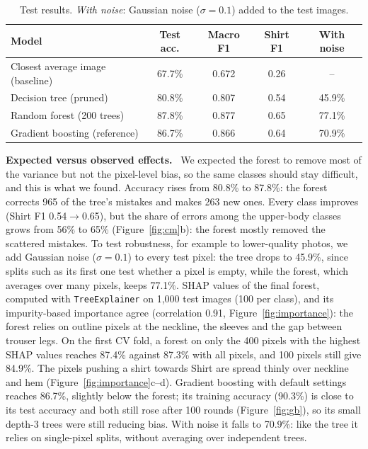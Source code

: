 \documentclass[11pt,a4paper]{article}
\newcommand{\pkg}[1]{\texttt{#1}}
\newcommand{\para}[1]{\textbf{#1}\ }
\begin{document}
\begin{table}[h]
\centering
\small
\begin{tabular}{lcccc}
\toprule
Model & Test acc. & Macro F1 & Shirt F1 & With noise \\
\midrule
Closest average image (baseline) & 67.7\% & 0.672 & 0.26 & -- \\
Decision tree (pruned)           & 80.8\% & 0.807 & 0.54 & 45.9\% \\
Random forest (200 trees)        & 87.8\% & 0.877 & 0.65 & 77.1\% \\
Gradient boosting (reference)    & 86.7\% & 0.866 & 0.64 & 70.9\% \\
\bottomrule
\end{tabular}
\caption{Test results. \emph{With noise}: Gaussian noise ($\sigma=0.1$) added to the test images.}
\label{tab:results}
\end{table}

\para{Expected versus observed effects.} We expected the forest to remove most of the variance but not the pixel-level bias, so the same classes should stay difficult, and this is what we found. Accuracy rises from 80.8\% to 87.8\%: the forest corrects 965 of the tree's mistakes and makes 263 new ones. Every class improves (Shirt F1 0.54$\to$0.65), but the share of errors among the upper-body classes grows from 56\% to 65\% (Figure~\ref{fig:cm}b): the forest mostly removed the scattered mistakes. To test robustness, for example to lower-quality photos, we add Gaussian noise ($\sigma=0.1$) to every test pixel: the tree drops to 45.9\%, since splits such as its first one test whether a pixel is empty, while the forest, which averages over many pixels, keeps 77.1\%. SHAP values of the final forest, computed with \pkg{TreeExplainer} on 1{,}000 test images (100 per class), and its impurity-based importance agree (correlation 0.91, Figure~\ref{fig:importance}): the forest relies on outline pixels at the neckline, the sleeves and the gap between trouser legs. On the first CV fold, a forest on only the 400 pixels with the highest SHAP values reaches 87.4\% against 87.3\% with all pixels, and 100 pixels still give 84.9\%. The pixels pushing a shirt towards Shirt are spread thinly over neckline and hem (Figure~\ref{fig:importance}c--d). Gradient boosting with default settings reaches 86.7\%, slightly below the forest; its training accuracy (90.3\%) is close to its test accuracy and both still rose after 100 rounds (Figure~\ref{fig:gb}), so its small depth-3 trees were still reducing bias. With noise it falls to 70.9\%: like the tree it relies on single-pixel splits, without averaging over independent trees.
\end{document}

